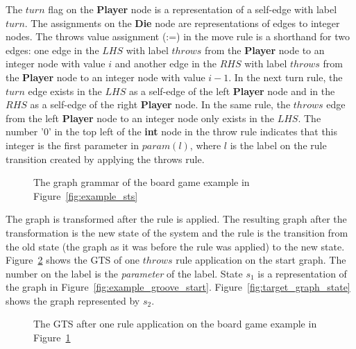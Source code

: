 The $turn$ flag on the \textbf{Player} node is a representation of a self-edge with label $turn$. The assignments on the \textbf{Die} node are representations of edges to integer nodes. The throws value assignment (:=) in the move rule is a shorthand for two edges: one edge in the $\mathit{LHS}$ with label $throws$ from the \textbf{Player} node to an integer node with value $i$ and another edge in the $\mathit{RHS}$ with label $throws$ from the \textbf{Player} node to an integer node with value $i-1$. In the next turn rule, the $turn$ edge exists in the $\mathit{LHS}$ as a self-edge of the left \textbf{Player} node and in the $\mathit{RHS}$ as a self-edge of the right \textbf{Player} node. In the same rule, the $throws$ edge from the left \textbf{Player} node to an integer node only exists in the $\mathit{LHS}$. The number '0' in the top left of the \textbf{int} node in the throw rule indicates that this integer is the first parameter in $param(l)$, where $l$ is the label on the rule transition created by applying the throws rule.

\begin{figure}[h!]
  \begin{center}
    \quad
  \end{center}
  \caption{The graph grammar of the board game example in Figure~\ref{fig:example_sts}}
  \label{fig:example_groove}
\end{figure}

The graph is transformed after the rule is applied. The resulting graph after the transformation is the new state of the system and the rule is the transition from the old state (the graph as it was before the rule was applied) to the new state. Figure~\ref{fig:gts_example} shows the GTS of one $throws$ rule application on the start graph. The number on the label is the \textit{parameter} of the label. State $s_1$ is a representation of the graph in Figure~\ref{fig:example_groove_start}. Figure~\ref{fig:target_graph_state} shows the graph represented by $s_2$.

\begin{figure}[h!]
  \begin{center}
    
  \end{center}
  \caption{The GTS after one rule application on the board game example in Figure~\ref{fig:example_groove}}
  \label{fig:gts_example}
\end{figure}

